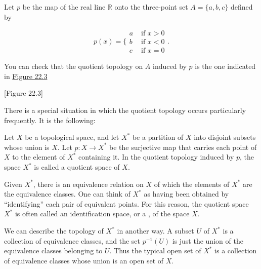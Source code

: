 \begin{centeredblock}
\begin{example}
\label{ex:\thesection.\theexample}
 Let \(p\) be the map of the real line \(\mathbb{R}\) onto the three-point set \(A = \{ a,b,c\}\) defined by

 \[
 p(x) = \{ \begin{array}{ll} a & \text{ if }x > 0 \\ b & \text{ if }x < 0 \\ c & \text{ if }x = 0 \end{array}.
 \]

 You can check that the quotient topology on \(A\) induced by \(p\) is the one indicated in \hyperref[fig:22.3]{Figure 22.3}

 [Figure 22.3]
\end{example}
\end{centeredblock}

There is a special situation in which the quotient topology occurs particularly frequently. It is the following:

\begin{definition}
 Let \(X\) be a topological space, and let \(X^{ * }\) be a partition of \(X\) into disjoint subsets whose union is \(X\). Let \(p : X \rightarrow {X}^{ * }\) be the surjective map that carries each point of \(X\) to the element of \(X^{ * }\) containing it. In the quotient topology induced by \(p\), the space \(X^{ * }\) is called a quotient space of \(X\).
\end{definition}

Given \(X^{ * }\), there is an equivalence relation on \(X\) of which the elements of \(X^{ * }\) are the equivalence classes. One can think of \(X^{ * }\) as having been obtained by ``identifying'' each pair of equivalent points. For this reason, the quotient space \(X^{ * }\) is often called an identification space, or a , of the space \(X\).

We can describe the topology of \(X^{ * }\) in another way. A subset \(U\) of \(X^{ * }\) is a collection of equivalence classes, and the set \(p^{-1}( U)\) is just the union of the equivalence classes belonging to \(U\). Thus the typical open set of \(X^{ * }\) is a collection of equivalence classes whose union is an open set of \(X\).

